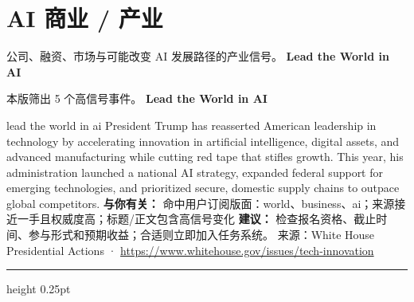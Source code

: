 \documentclass[10.5pt]{ctexart}
\begin{document}
\section*{AI 商业 / 产业}
{\color{ormuted} 公司、融资、市场与可能改变 AI 发展路径的产业信号。}
\vspace{2mm}
{\LARGE\bfseries Lead the World in AI}\par
\vspace{1mm}
{\color{ormuted} 本版筛出 5 个高信号事件。}
\vspace{3mm}
{\Large\bfseries Lead the World in AI}\par
lead the world in ai President Trump has reasserted American leadership in technology by accelerating innovation in artificial intelligence, digital assets, and advanced manufacturing while cutting red tape that stifles growth. This year, his administration launched a national AI strategy, expanded federal support for emerging technologies, and prioritized secure, domestic supply chains to outpace global competitors.
\textbf{与你有关：} 命中用户订阅版面：world、business、ai；来源接近一手且权威度高；标题/正文包含高信号变化
\textbf{建议：} 检查报名资格、截止时间、参与形式和预期收益；合适则立即加入任务系统。
{\footnotesize\color{ormuted} 来源：White House Presidential Actions · \url{https://www.whitehouse.gov/issues/tech-innovation}}
\vspace{4mm}
\hrule height 0.25pt
\vspace{3mm}
\end{document}
